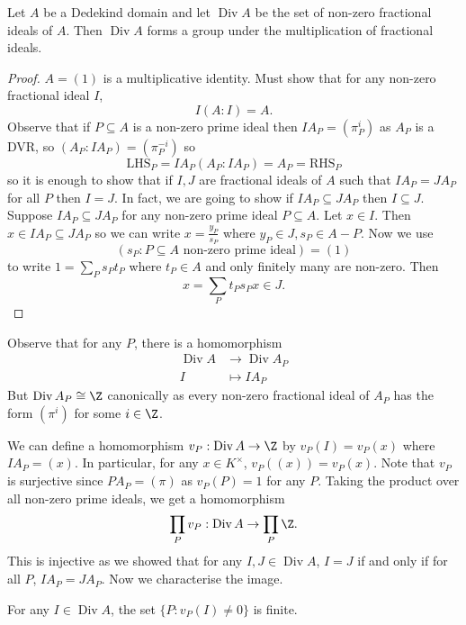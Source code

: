 \documentclass[a4paper]{article}
\DeclareMathOperator{\Div}{Div}
\begin{document}
\begin{proposition}
  Let \(A\) be a Dedekind domain and let \(\Div A\) be the set of non-zero fractional ideals of \(A\). Then \(\Div A\) forms a group under the multiplication of fractional ideals.
\end{proposition}

\begin{proof}
  \(A = (1)\) is a multiplicative identity. Must show that for any non-zero fractional ideal \(I\),
  \[
    I (A : I) = A.
  \]
  Observe that if \(P \subseteq A\) is a non-zero prime ideal then \(IA_P = (\pi_P^i)\) as \(A_P\) is a DVR, so \((A_P: IA_P) = (\pi_P^{-i})\) so
  \[
    \text{LHS}_P = IA_P (A_P: IA_P) = A_P = \text{RHS}_P
  \]
  so it is enough to show that if \(I, J\) are fractional ideals of \(A\) such that \(IA_P = JA_P\) for all \(P\) then \(I = J\). In fact, we are going to show if \(IA_P \subseteq JA_P\) then \(I \subseteq J\). Suppose \(IA_P \subseteq JA_P\) for any non-zero prime ideal \(P \subseteq A\). Let \(x \in I\). Then \(x \in IA_P \subseteq JA_P\) so we can write \(x = \frac{y_P}{s_P}\) where \(y_P \in J, s_P \in A - P\). Now we use
  \[
    (s_P: P \subseteq A \text{ non-zero prime ideal}) = (1)
  \]
  to write \(1 = \sum_P s_P t_P\) where \(t_P \in A\) and only finitely many are non-zero. Then
  \[
    x = \sum_P t_Ps_P x \in J.
  \]
\end{proof}

Observe that for any \(P\), there is a homomorphism
\begin{align*}
  \Div A &\to \Div A_P \\
  I &\mapsto IA_P
\end{align*}
But \(\Div A_P \cong \Z\) canonically as every non-zero fractional ideal of \(A_P\) has the form \((\pi^i)\) for some \(i \in \Z\).

We can define a homomorphism \(v_P: \Div A \to \Z\) by \(v_P(I) = v_P(x)\) where \(IA_P = (x)\). In particular, for any \(x \in K^\times\), \(v_P((x)) = v_P(x)\). Note that \(v_P\) is surjective since \(P A_P = (\pi)\) as \(v_P(P) = 1\) for any \(P\). Taking the product over all non-zero prime ideals, we get a homomorphism
\[
  \prod_P v_P: \Div A \to \prod_P \Z.
\]
This is injective as we showed that for any \(I, J \in \Div A\), \(I = J\) if and only if for all \(P\), \(I A_P = J A_P\). Now we characterise the image.

\begin{lemma}
  For any \(I \in \Div A\), the set \(\{P: v_P(I) \neq 0\}\) is finite. 
\end{lemma}
\end{document}
